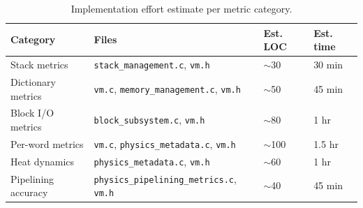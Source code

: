 \begin{table}[ht]
\centering
\small
\begin{tabular}{llll}
\toprule
Category & Files & Est. LOC & Est. time \\
\midrule
Stack metrics & \texttt{stack\_management.c}, \texttt{vm.h} & $\sim$30 & 30 min \\
Dictionary metrics & \texttt{vm.c}, \texttt{memory\_management.c}, \texttt{vm.h} & $\sim$50 & 45 min \\
Block I/O metrics & \texttt{block\_subsystem.c}, \texttt{vm.h} & $\sim$80 & 1 hr \\
Per-word metrics & \texttt{vm.c}, \texttt{physics\_metadata.c}, \texttt{vm.h} & $\sim$100 & 1.5 hr \\
Heat dynamics & \texttt{physics\_metadata.c}, \texttt{vm.h} & $\sim$60 & 1 hr \\
Pipelining accuracy & \texttt{physics\_pipelining\_metrics.c}, \texttt{vm.h} & $\sim$40 & 45 min \\
\bottomrule
\end{tabular}
\caption{Implementation effort estimate per metric category.}
\end{table}
